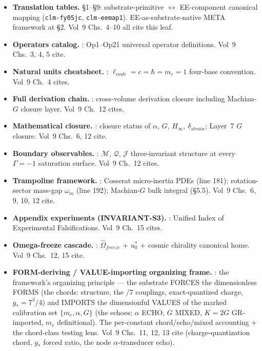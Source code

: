 \begin{itemize}
    \item \textbf{Translation tables.}  \S 1--\S 9: substrate-primitive $\leftrightarrow$ EE-component canonical mapping (\texttt{clm-fy05jc}, \texttt{clm-eemap1}). EE-as-substrate-native META framework at \S 2. Vol~9 Chs.~4--10 all cite this leaf.
    \item \textbf{Operators catalog.} : Op1--Op21 universal operator definitions. Vol~9 Chs.~3, 4, 5 cite.
    \item \textbf{Natural units cheatsheet.} : $\ell_{node} = c = \hbar = m_e = 1$ four-base convention. Vol~9 Ch.~4 cites.
    \item \textbf{Full derivation chain.} : cross-volume derivation closure including Machian-$G$ closure layer. Vol~9 Ch.~12 cites.
    \item \textbf{Mathematical closure.} : closure status of $\alpha$, $G$, $H_\infty$, $\delta_{strain}$; Layer~7 $G$ closure. Vol~9 Chs.~6, 12 cite.
    \item \textbf{Boundary observables.} : $\mathcal{M}$, $\mathcal{Q}$, $\mathcal{J}$ three-invariant structure at every $\Gamma = -1$\gammaundeclared{} saturation surface. Vol~9 Ch.~12 cites.
    \item \textbf{Trampoline framework.} : Cosserat micro-inertia PDEs (line 181); rotation-sector mass-gap $\omega_m$ (line 192); Machian-$G$ bulk integral (\S 5.5). Vol~9 Chs.~6, 9, 10, 12 cite.
    \item \textbf{Appendix experiments (INVARIANT-S3).} : Unified Index of Experimental Falsifications. Vol~9 Ch.~15 cites.
    \item \textbf{Omega-freeze cascade.} : $\hat{\Omega}_{freeze}$ + $u_0^*$ + cosmic chirality canonical home. Vol~9 Chs.~12, 15 cite.
    \item \textbf{FORM-deriving / VALUE-importing organizing frame.} : the framework's organizing principle --- the substrate FORCES the dimensionless FORMS (the chords: structure, the $/7$ couplings, exact-quantized charge, $g_* = 7^3/4$) and IMPORTS the dimensionful VALUES of the marked calibration set $\{m_e, \alpha, G\}$ (the echoes; $\alpha$ ECHO, $G$ MIXED, $K{=}2G$ GR-imported, $m_e$ definitional). The per-constant chord/echo/mixed accounting + the chord-class testing lens. Vol~9 Chs.~11, 12, 13 cite (charge-quantization chord, $g_*$ forced ratio, the node $\alpha$-transducer echo).

\end{itemize}
